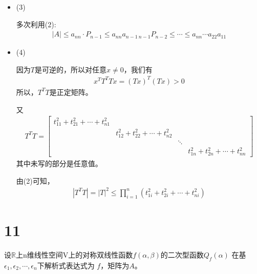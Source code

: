 \documentclass{article}
\begin{document}
\begin{itemize}
  \item (3)

        多次利用(2):
        \begin{align*}
          |A| \leq a_{nn} \cdot P_{n - 1} \leq a_{nn}  a_{n-1 \  n-1} P_{n - 2} \leq \cdots \leq a_{nn} \cdots a_{22} a_{11}
        \end{align*}

  \item (4)

        因为$T$是可逆的，所以对任意$x \neq 0$，我们有
        \begin{align*}
          x^T T^T T x = (Tx)^T (T x) > 0
        \end{align*}
        所以，$T^T T$是正定矩阵。

        又
        \begin{align*}
          T^T T = \begin{bmatrix}
                    t_{11}^2 + t_{21}^2 + \cdots + t_{n1}^2 &                                                                                            \\
                                                            & t_{12}^2 + t_{22}^2 + \cdots + t_{n2}^2 &                                                  \\
                                                            &                                         & \ddots                                           \\
                                                            &                                         &        & t_{1n}^2 + t_{2n}^2 + \cdots + t_{nn}^2
                  \end{bmatrix}
        \end{align*}
        其中未写的部分是任意值。

        由(2)可知，
        \begin{align*}
          |T^T T| = |T|^2 \leq \prod\limits_{i = 1}^n (t_{1i}^2 + t_{2i}^2 + \cdots + t_{ni}^2)
        \end{align*}
\end{itemize}

\section*{11}

设$\mathbb{R}$上n维线性空间V上的对称双线性函数$f(\alpha, \beta)$的二次型函数$Q_f(\alpha)$
在基$\epsilon_1, \epsilon_2, \cdots, \epsilon_n$下解析式表达式为
$f$，矩阵为$A$。
\end{document}
